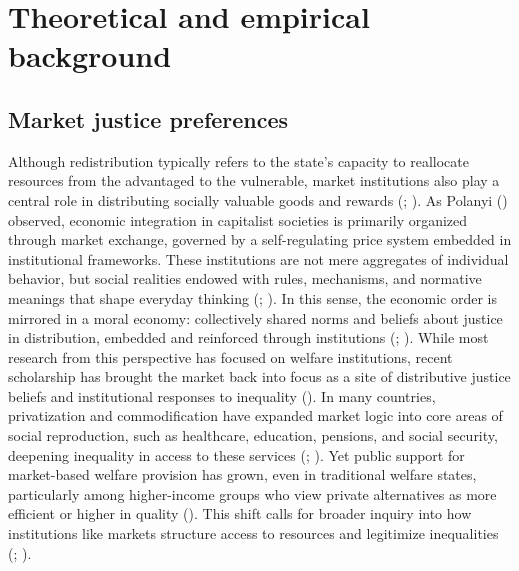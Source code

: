 \documentclass[
  12pt,
]{article}
\begin{document}
\section{Theoretical and empirical
background}\label{theoretical-and-empirical-background}

\subsection{Market justice
preferences}\label{market-justice-preferences}

Although redistribution typically refers to the state's capacity to
reallocate resources from the advantaged to the vulnerable, market
institutions also play a central role in distributing socially valuable
goods and rewards (; ). As
Polanyi () observed, economic
integration in capitalist societies is primarily organized through
market exchange, governed by a self-regulating price system embedded in
institutional frameworks. These institutions are not mere aggregates of
individual behavior, but social realities endowed with rules,
mechanisms, and normative meanings that shape everyday thinking
(;
). In this sense,
the economic order is mirrored in a moral economy: collectively shared
norms and beliefs about justice in distribution, embedded and reinforced
through institutions (;
). While most
research from this perspective has focused on welfare institutions,
recent scholarship has brought the market back into focus as a site of
distributive justice beliefs and institutional responses to inequality
(). In many
countries, privatization and commodification have expanded market logic
into core areas of social reproduction, such as healthcare, education,
pensions, and social security, deepening inequality in access to these
services (;
). Yet public support
for market-based welfare provision has grown, even in traditional
welfare states, particularly among higher-income groups who view private
alternatives as more efficient or higher in quality
().
This shift calls for broader inquiry into how institutions like markets
structure access to resources and legitimize inequalities
(;
).
\end{document}
